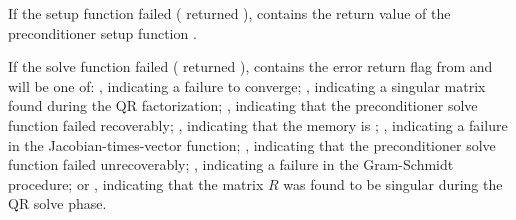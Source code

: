 {
  If the {\cvspgmr} setup function failed ( returned
  ),  contains the return value of the
  preconditioner setup function .

  If the {\cvspgmr} solve function failed ( returned
  ),  contains the error return flag from
   and will be one of:
 , indicating a failure to converge;
 , indicating a singular matrix found during the QR
  factorization;
 , indicating that the preconditioner solve function
  failed recoverably;
  , indicating that the {\spgmr} memory is ;
  , indicating a failure in the Jacobian-times-vector
  function;
  , indicating that the preconditioner solve
  function  failed unrecoverably;
  , indicating a failure in the Gram-Schmidt procedure; 
  or , indicating that the matrix $R$ was found to be
  singular during the QR solve phase.
}

